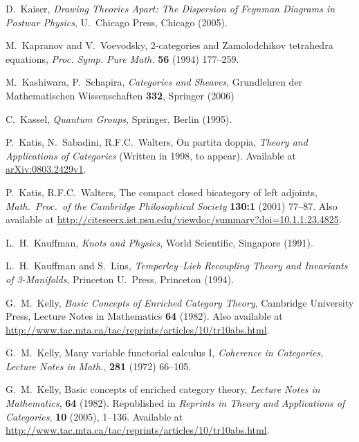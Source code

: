 \documentclass[12pt,twoside,openright]{report}
\begin{document}
\begin{thebibliography}{99}
D.\ Kaiser, \textsl{Drawing Theories Apart: The Dispersion of Feynman Diagrams in Postwar Physics}, U.\ Chicago Press, Chicago (2005).

 M.\ Kapranov and V.\ Voevodsky, 2-categories and Zamolodchikov tetrahedra equations, \textsl{Proc. Symp. Pure Math.} \textbf{56} (1994) 177--259.

 M.\ Kashiwara, P.\ Schapira, \textsl{Categories and Sheaves}, Grundlehren der Mathematischen Wissenschaften \textbf{332}, Springer (2006)

 C.\ Kassel, \textsl{Quantum Groups}, Springer, Berlin (1995).

 P.\ Katis, N.\ Sabadini, R.F.C.\ Walters, On partita doppia, \textsl{Theory and Applications of Categories} (Written in 1998, to appear).  Available at \href{http://arxiv.org/abs/0803.2429}{arXiv:0803.2429v1}.

 P.\ Katis, R.F.C.\ Walters, The compact closed bicategory of left adjoints, \textsl{Math.\ Proc.\ of the Cambridge Philosophical Society} \textbf{130:1} (2001) 77--87.  Also available at \href{http://citeseerx.ist.psu.edu/viewdoc/summary?doi=10.1.1.23.4825}{http://citeseerx.ist.psu.edu/viewdoc/summary?doi=10.1.1.23.4825}.

L.\ H.\ Kauffman, {\sl Knots and Physics}, World Scientific, Singapore (1991).

L.\ H.\ Kauffman and S.\ Lins, {\sl Temperley--Lieb Recoupling Theory and Invariants of 3-Manifolds}, Princeton U.\ Press, Princeton (1994).

 G.\ M.\ Kelly, \textsl{Basic Concepts of Enriched Category Theory}, Cambridge University Press, Lecture Notes in Mathematics \textbf{64} (1982).  Also available at \href{http://www.tac.mta.ca/tac/reprints/articles/10/tr10abs.html}{http://www.tac.mta.ca/tac/reprints/articles/10/tr10abs.html}.

 G.\ M.\ Kelly, Many variable functorial calculus I, \textsl{Coherence in Categories, Lecture Notes in Math.}, \textbf{281} (1972) 66--105.

 G.\ M.\ Kelly, Basic concepts of enriched category theory, \textsl{Lecture Notes in Mathematics}, \textbf{64} (1982).  Republished in \textsl{Reprints in Theory and Applications of Categories}, \textbf{10} (2005), 1--136.  Available at \href{http://www.tac.mta.ca/tac/reprints/articles/10/tr10abs.html}{http://www.tac.mta.ca/tac/reprints/articles/10/tr10abs.html}.


\end{thebibliography}
\end{document}
